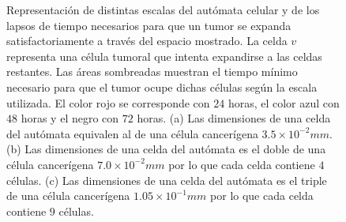 \begin{figure}[!ht]
\begin{center}
\end{center}\vspace*{-0.5cm}
\caption[Representaci\'on de distintas escalas del aut\'omata celular]{Representaci\'on de distintas escalas del aut\'omata celular y de los lapsos de tiempo necesarios para que un tumor se expanda satisfactoriamente a trav\'es del espacio mostrado. La celda $v$ representa una c\'elula tumoral que intenta expandirse a las celdas restantes. Las \'areas sombreadas muestran el tiempo m\'inimo necesario para que el tumor ocupe dichas c\'elulas seg\'un la escala utilizada. El color rojo se corresponde con $24$ horas, el color azul con $48$ horas y el negro con $72$ horas. (a) Las dimensiones de una celda del aut\'omata equivalen al de una c\'elula cancer\'igena $3$.$5 \times 10^{-2}mm$. (b) Las dimensiones de una celda del aut\'omata es el doble de una c\'elula cancer\'igena $7$.$0 \times 10^{-2}mm$ por lo que cada celda contiene $4$ c\'elulas. (c) Las dimensiones de una celda del aut\'omata es el triple de una c\'elula cancer\'igena $1$.$05 \times 10^{-1}mm$ por lo que cada celda contiene $9$ c\'elulas.}
\label{fig-scales-1}
\end{figure}

